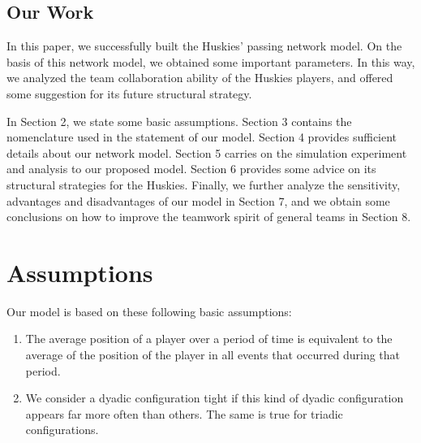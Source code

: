\documentclass{mcmthesis}
\begin{document}
\subsection{Our Work}
	In this paper, we successfully built the Huskies' passing network model.  On the basis of this network model, we obtained some important parameters. In this way, we analyzed the team collaboration ability of the Huskies players, and offered some suggestion for its future structural strategy.

	In Section 2, we state some basic assumptions.  Section 3 contains the nomenclature used in the statement of our model.  Section 4 provides sufficient details about our network model.  Section 5 carries on the simulation experiment and analysis to our proposed model.  Section 6 provides some advice on its structural strategies for the Huskies.  Finally, we further analyze the sensitivity, advantages and disadvantages of our model in Section 7, and we obtain some conclusions on how to improve the teamwork spirit of general teams in Section 8.
\section{Assumptions}
	Our model is based on these following basic assumptions:
	\begin{enumerate}
		\item The average position of a player over a period of time is equivalent to the average of the position of the player in all events that occurred during that period.
		\item We consider a dyadic configuration tight if this kind of dyadic configuration appears far more often than others.  The same is true for triadic configurations.
	\end{enumerate}
\end{document}
